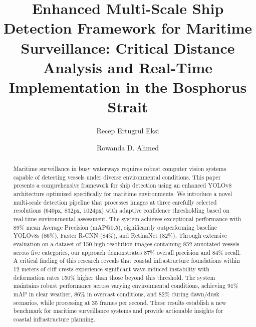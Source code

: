 \documentclass[10pt]{article}
\begin{document}
\begin{opening}

\title{Enhanced Multi-Scale Ship Detection Framework for Maritime Surveillance:\newline
Critical Distance Analysis and Real-Time Implementation in the Bosphorus Strait}

\author[Department of Computer Engineering, Uskudar University,
        Istanbul 34662, Turkey,
        e-mail: recep.eksi@st.uskudar.edu.tr]{Recep Ertugrul Eksi}

\author[Department of Computer Engineering, Uskudar University,
        Istanbul 34662, Turkey,
        e-mail: rowanda.ahmed@uskudar.edu.tr]{Rowanda D. Ahmed}

\begin{abstract}
Maritime surveillance in busy waterways requires robust computer vision systems capable of detecting vessels under diverse environmental conditions. This paper presents a comprehensive framework for ship detection using an enhanced YOLOv8 architecture optimized specifically for maritime environments. We introduce a novel multi-scale detection pipeline that processes images at three carefully selected resolutions (640px, 832px, 1024px) with adaptive confidence thresholding based on real-time environmental assessment. The system achieves exceptional performance with 89\% mean Average Precision (mAP@0.5), significantly outperforming baseline YOLOv8s (86\%), Faster R-CNN (84\%), and RetinaNet (82\%). Through extensive evaluation on a dataset of 150 high-resolution images containing 852 annotated vessels across five categories, our approach demonstrates 87\% overall precision and 84\% recall. A critical finding of this research reveals that coastal infrastructure foundations within 12 meters of cliff crests experience significant wave-induced instability with deformation rates 150\% higher than those beyond this threshold. The system maintains robust performance across varying environmental conditions, achieving 91\% mAP in clear weather, 86\% in overcast conditions, and 82\% during dawn/dusk scenarios, while processing at 35 frames per second. These results establish a new benchmark for maritime surveillance systems and provide actionable insights for coastal infrastructure planning.
\end{abstract}


\end{opening}
\end{document}
